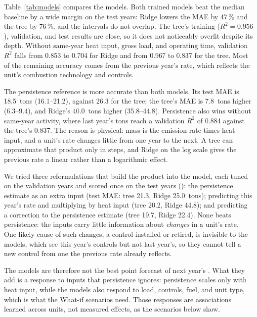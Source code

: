 \documentclass[11pt,a4paper]{article}
\begin{document}
Table~\ref{tab:models} compares the models. Both trained models beat the median baseline by a
wide margin on the test years: Ridge lowers the MAE by 47\,\% and the tree by 76\,\%, and the
intervals do not overlap. The tree's training ($R^2 = 0.956$), validation, and test results are
close, so it does not noticeably overfit despite its depth. Without same-year heat input, gross
load, and operating time, validation $R^2$ falls from 0.853 to 0.704 for Ridge and from 0.967 to
0.837 for the tree. Most of the remaining accuracy comes from the previous year's \NOx{} rate,
which reflects the unit's combustion technology and controls.

The persistence reference is more accurate than both models. Its test MAE is 18.5~tons
(16.1--21.2), against 26.3 for the tree; the tree's MAE is 7.8~tons higher (6.3--9.4), and
Ridge's 40.0~tons higher (35.8--44.8). Persistence also wins without same-year activity, where
last year's tons reach a validation $R^2$ of 0.884 against the tree's 0.837. The reason is
physical: \NOx{} mass is the emission rate times heat input, and a unit's rate changes little from
one year to the next. A tree can approximate that product only in steps, and Ridge on the log
scale gives the previous rate a linear rather than a logarithmic effect.

We tried three reformulations that build the product into the model, each tuned on the
validation years and scored once on the test years (): the
persistence estimate as an extra input (test MAE: tree 21.3, Ridge 25.0~tons); predicting this
year's rate and multiplying by heat input (tree 20.2, Ridge 44.8); and predicting a correction
to the persistence estimate (tree 19.7, Ridge 22.4). None beats persistence: the inputs carry
little information about \emph{changes} in a unit's rate. One likely cause of such changes, a
control installed or retired, is invisible to the models, which see this year's controls but not
last year's, so they cannot tell a new control from one the previous rate already reflects.

The models are therefore not the best point forecast of next year's \NOx{}. What they add is a
response to inputs that persistence ignores: persistence scales only with heat input, while the
models also respond to load, controls, fuel, and unit type, which is what the What-if scenarios
need. Those responses are associations learned across units, not measured effects, as the
scenarios below show.
\end{document}
